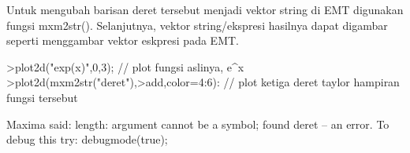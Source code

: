\documentclass[a4paper,10pt]{article}
\begin{document}
\begin{eulernotebook}
\begin{eulercomment}
\begin{eulercomment}
\begin{eulercomment}
\begin{eulercomment}
\begin{eulercomment}
\begin{eulercomment}
\begin{eulercomment}
\begin{eulercomment}
\begin{eulercomment}
\begin{eulercomment}
\begin{eulercomment}
\begin{eulercomment}
\begin{eulercomment}
\begin{eulercomment}
\begin{eulercomment}
\begin{eulercomment}
\begin{eulercomment}
\begin{eulercomment}
\begin{eulercomment}
\begin{eulercomment}
\begin{eulercomment}
\begin{eulercomment}
\begin{euleroutput}
\end{euleroutput}
\begin{eulercomment}
Untuk mengubah barisan deret tersebut menjadi vektor string di EMT digunakan fungsi
mxm2str(). Selanjutnya, vektor string/ekspresi hasilnya dapat digambar seperti menggambar
vektor eskpresi pada EMT.
\end{eulercomment}
\begin{eulerprompt}
>plot2d("exp(x)",0,3); // plot fungsi aslinya, e^x
>plot2d(mxm2str("deret"),>add,color=4:6): // plot ketiga deret taylor hampiran fungsi tersebut
\end{eulerprompt}
\begin{euleroutput}
  Maxima said:
  length: argument cannot be a symbol; found deret
   -- an error. To debug this try: debugmode(true);
  

\end{euleroutput}
\end{eulercomment}
\end{eulercomment}
\end{eulercomment}
\end{eulercomment}
\end{eulercomment}
\end{eulercomment}
\end{eulercomment}
\end{eulercomment}
\end{eulercomment}
\end{eulercomment}
\end{eulercomment}
\end{eulercomment}
\end{eulercomment}
\end{eulercomment}
\end{eulercomment}
\end{eulercomment}
\end{eulercomment}
\end{eulercomment}
\end{eulercomment}
\end{eulercomment}
\end{eulercomment}
\end{eulercomment}
\end{eulernotebook}
\end{document}
